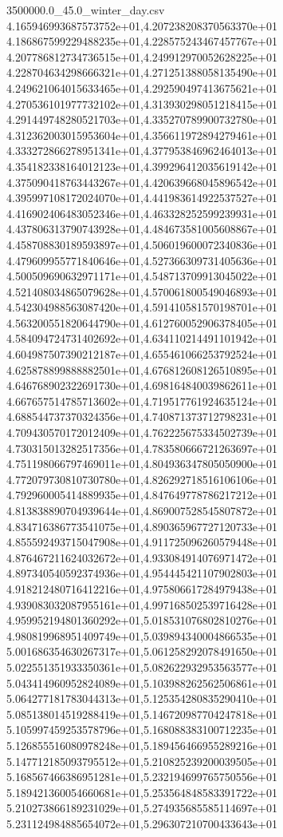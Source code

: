 \begin{filecontents*}{3500000.0_45.0_winter_day.csv}
4.165946993687573752e+01,4.207238208370563370e+01
4.186867599229488235e+01,4.228575243467457767e+01
4.207786812734736515e+01,4.249912970052628225e+01
4.228704634298666321e+01,4.271251388058135490e+01
4.249621064015633465e+01,4.292590497413675621e+01
4.270536101977732102e+01,4.313930298051218415e+01
4.291449748280521703e+01,4.335270789900732780e+01
4.312362003015953604e+01,4.356611972894279461e+01
4.333272866278951341e+01,4.377953846962464013e+01
4.354182338164012123e+01,4.399296412035619142e+01
4.375090418763443267e+01,4.420639668045896542e+01
4.395997108172024070e+01,4.441983614922537527e+01
4.416902406483052346e+01,4.463328252599239931e+01
4.437806313790743928e+01,4.484673581005608867e+01
4.458708830189593897e+01,4.506019600072340836e+01
4.479609955771840646e+01,4.527366309731405636e+01
4.500509690632971171e+01,4.548713709913045022e+01
4.521408034865079628e+01,4.570061800549046893e+01
4.542304988563087420e+01,4.591410581570198701e+01
4.563200551820644790e+01,4.612760052906378405e+01
4.584094724731402692e+01,4.634110214491101942e+01
4.604987507390212187e+01,4.655461066253792524e+01
4.625878899888882501e+01,4.676812608126510895e+01
4.646768902322691730e+01,4.698164840039862611e+01
4.667657514785713602e+01,4.719517761924635124e+01
4.688544737370324356e+01,4.740871373712798231e+01
4.709430570172012409e+01,4.762225675334502739e+01
4.730315013282517356e+01,4.783580666721263697e+01
4.751198066797469011e+01,4.804936347805050900e+01
4.772079730810730780e+01,4.826292718516106106e+01
4.792960005414889935e+01,4.847649778786217212e+01
4.813838890704939644e+01,4.869007528545807872e+01
4.834716386773541075e+01,4.890365967727120733e+01
4.855592493715047908e+01,4.911725096260579448e+01
4.876467211624032672e+01,4.933084914076971472e+01
4.897340540592374936e+01,4.954445421107902803e+01
4.918212480716412216e+01,4.975806617284979438e+01
4.939083032087955161e+01,4.997168502539716428e+01
4.959952194801360292e+01,5.018531076802810276e+01
4.980819968951409749e+01,5.039894340004866535e+01
5.001686354630267317e+01,5.061258292078491650e+01
5.022551351933350361e+01,5.082622932953563577e+01
5.043414960952824089e+01,5.103988262562506861e+01
5.064277181783044313e+01,5.125354280835290410e+01
5.085138014519288419e+01,5.146720987704247818e+01
5.105997459253578796e+01,5.168088383100712235e+01
5.126855516080978248e+01,5.189456466955289216e+01
5.147712185093795512e+01,5.210825239200039505e+01
5.168567466386951281e+01,5.232194699765750556e+01
5.189421360054660681e+01,5.253564848583391722e+01
5.210273866189231029e+01,5.274935685585114697e+01
5.231124984885654072e+01,5.296307210700433643e+01

\end{filecontents*}
